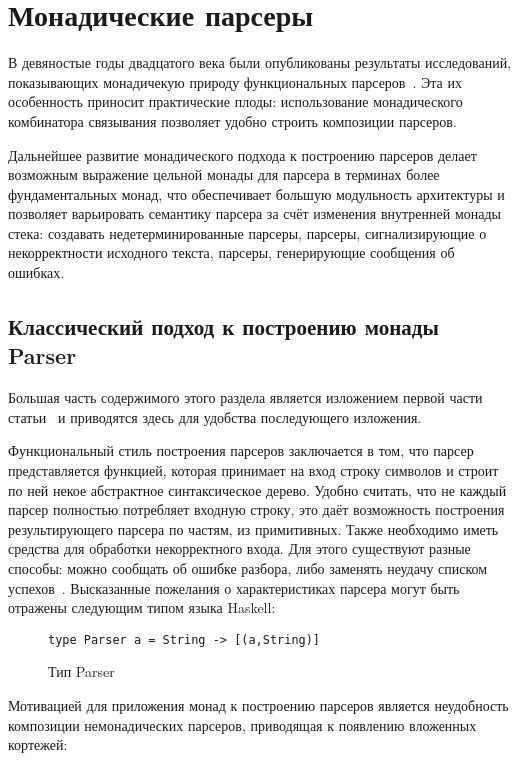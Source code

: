 \chapter{Монадические парсеры}

В девяностые годы двадцатого века были опубликованы результаты исследований,
показывающих монадичекую природу функциональных парсеров~\cite{wadlerMonads}. 
Эта их особенность приносит практические плоды: использование 
монадического комбинатора связывания позволяет удобно строить композиции 
парсеров.

Дальнейшее развитие монадического подхода к построению парсеров делает возможным
выражение цельной монады для парсера в терминах более фундаментальных монад, что
обеспечивает большую модульность архитектуры и позволяет варьировать семантику
парсера за счёт изменения внутренней монады стека: создавать недетерминированные
парсеры, парсеры, сигнализирующие о некорректности исходного текста, парсеры,
генерирующие сообщения об ошибках.

\section{Классический подход к построению монады Parser}

Большая часть содержимого этого раздела является изложением первой части
статьи~\cite{monParsing} и приводятся здесь для удобства последующего изложения.

Функциональный стиль построения парсеров заключается в том, что парсер
представляется функцией, которая принимает на вход строку символов и строит
по ней некое абстрактное синтаксическое дерево. Удобно считать, что не каждый 
парсер полностью потребляет входную строку, это даёт возможность 
построения результирующего парсера по частям, из примитивных. Также необходимо 
иметь средства для обработки некорректного входа. Для этого существуют разные 
способы: можно сообщать об ошибке разбора, либо заменять неудачу списком 
успехов~\cite{wadlerSuccess}. Высказанные пожелания о характеристиках 
парсера могут быть отражены следующим типом языка Haskell:

\begin{figure}[h]
\begin{lstlisting}
type Parser a = String -> [(a,String)]
\end{lstlisting}
\caption{Тип Parser}
\end{figure}

Мотивацией для приложения монад к построению парсеров является неудобность 
композиции немонадических парсеров, приводящая к появлению вложенных кортежей:


